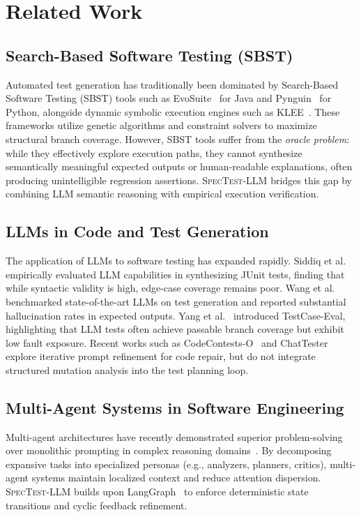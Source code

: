 \documentclass[conference]{IEEEtran}
\begin{document}
\section{Related Work}
\label{sec:related}

\subsection{Search-Based Software Testing (SBST)}
Automated test generation has traditionally been dominated by Search-Based Software Testing (SBST) tools such as EvoSuite~\cite{fraser2011evosuite} for Java and Pynguin~\cite{lukasczyk2022pynguin} for Python, alongside dynamic symbolic execution engines such as KLEE~\cite{cadar2008klee}. These frameworks utilize genetic algorithms and constraint solvers to maximize structural branch coverage. However, SBST tools suffer from the \emph{oracle problem}: while they effectively explore execution paths, they cannot synthesize semantically meaningful expected outputs or human-readable explanations, often producing unintelligible regression assertions. \textsc{SpecTest-LLM} bridges this gap by combining LLM semantic reasoning with empirical execution verification.

\subsection{LLMs in Code and Test Generation}
The application of LLMs to software testing has expanded rapidly. Siddiq et al.~\cite{siddiq2024} empirically evaluated LLM capabilities in synthesizing JUnit tests, finding that while syntactic validity is high, edge-case coverage remains poor. Wang et al.~\cite{wang2025benchmarking} benchmarked state-of-the-art LLMs on test generation and reported substantial hallucination rates in expected outputs. Yang et al.~\cite{yang2025} introduced TestCase-Eval, highlighting that LLM tests often achieve passable branch coverage but exhibit low fault exposure. Recent works such as CodeContests-O~\cite{cai2025} and ChatTester~\cite{yuan2023chattester} explore iterative prompt refinement for code repair, but do not integrate structured mutation analysis into the test planning loop.

\subsection{Multi-Agent Systems in Software Engineering}
Multi-agent architectures have recently demonstrated superior problem-solving over monolithic prompting in complex reasoning domains~\cite{chen2025debate,kumari2025}. By decomposing expansive tasks into specialized personas (e.g., analyzers, planners, critics), multi-agent systems maintain localized context and reduce attention dispersion. \textsc{SpecTest-LLM} builds upon LangGraph~\cite{langgraph2024} to enforce deterministic state transitions and cyclic feedback refinement.
\end{document}
